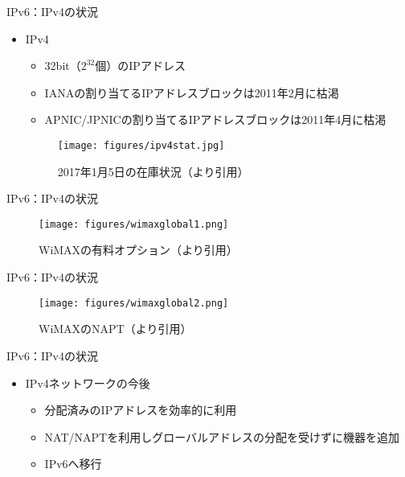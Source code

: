 \documentclass[12pt,aspectratio=169]{beamer}
\begin{document}
\begin{frame}{IPv6：IPv4の状況}

  \begin{itemize}
    \item IPv4
    \begin{itemize}
      \item 32bit（\( 2^{32} \)個）のIPアドレス
      \item IANAの割り当てるIPアドレスブロックは2011年2月に枯渇 \cite{jpnic:ip枯渇}
      \item APNIC/JPNICの割り当てるIPアドレスブロックは2011年4月に枯渇 \cite{jpnic:ip枯渇}
    \end{itemize}

    \centering
    \begin{figure}
      \centering
      \texttt{[image: figures/ipv4stat.jpg]}
      \label{fig:ipv4stat}
      \caption{2017年1月5日の在庫状況（\cite{jpnic:ip枯渇}より引用）}
    \end{figure}

  \end{itemize}

\end{frame}

\begin{frame}{IPv6：IPv4の状況}

  \centering
  \begin{figure}
    \centering
    \texttt{[image: figures/wimaxglobal1.png]}
    \label{fig:wimaxglobal1}
    \caption{WiMAXの有料オプション（\cite{wimax:napt}より引用）}
  \end{figure}

\end{frame}

\begin{frame}{IPv6：IPv4の状況}

  \centering
  \begin{figure}
    \centering
    \texttt{[image: figures/wimaxglobal2.png]}
    \label{fig:wimaxglobal2}
    \caption{WiMAXのNAPT（\cite{wimax:napt}より引用）}
  \end{figure}

\end{frame}

\begin{frame}{IPv6：IPv4の状況}

  \begin{itemize}
    \item IPv4ネットワークの今後\cite{jpnic:ip枯渇}
    \begin{itemize}
      \item 分配済みのIPアドレスを効率的に利用
      \item NAT/NAPTを利用しグローバルアドレスの分配を受けずに機器を追加
      \item IPv6へ移行
    \end{itemize}
  \end{itemize}

\end{frame}
\end{document}
